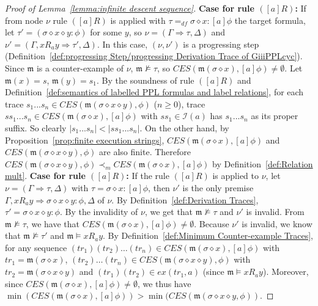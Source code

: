 \documentclass[manuscript,screen]{acmart}
\newcommand{\mcl}[1]{\mathcal{#1}}
\newcommand{\mfr}[1]{\mathfrak{#1}}
\newcommand{\dddef}[0]{=_{df}}
\newcommand{\mult}[0]{\preceq_m}
\newcommand{\pmult}[0]{\prec_m}
\newcommand{\lm}[0]{\mfr{m}}
\newcommand{\EX}[0]{\textit{CES}}
\newcommand{\ex}[0]{\textit{ex}}
\newcommand{\mex}[0]{\textit{mex}}
\newcommand{\cat}[0]{\diamond}
\newcommand{\I}[0]{\mcl{I}}
\begin{document}
\begin{proof}[Proof of Lemma~\ref{lemma:infinite descent sequence}]
\ifx
\textbf{Case for rule $([a]R)$: }
    If from node $\nu$ rule $([a]R)$ is applied with $\tau\dddef \sigma\cat x : [a]\phi$ the target formula, 
    let $\tau' = (\sigma\cat x\cat y : \phi)$ for some $y$, so $\nu=(\Gamma\Rightarrow \tau, \Delta)$ and $\nu' = (\Gamma, xR_a y\Rightarrow \tau', \Delta)$. 
    In this case, $(\nu, \nu')$ is a progressing step (Definition~\ref{def:progressing Step/progressing Derivation Trace of GiiiPPLcyc}). 
    Since $\lm$ is a counter-example of $\nu$, $\lm\not\models \tau$, so $\EX(\lm(\sigma\cat x), [a]\phi)\neq \emptyset$. 
    Let $\lm(x) = s$, $\lm(y) = s_1$. 
    By the soundness of rule $([a]R)$ and Definition~\ref{def:semantics of labelled PPL formulas and label relations}, for each trace $s_1...s_n\in \EX(\lm(\sigma\cat x\cat y), \phi)$ ($n\ge 0$), 
    trace $ss_1...s_n\in \EX(\lm(\sigma\cat x), [a]\phi)$ with $ss_1\in \I(a)$ has $s_1...s_n$ as its proper suffix. 
    So clearly $|s_1...s_n| < |ss_1...s_n|$. 
    On the other hand, by Proposition~\ref{prop:finite execution strings}, %
    $\EX(\lm(\sigma\cat x), [a]\phi)$ and $\EX(\lm(\sigma\cat x\cat y), \phi)$
    are also finite. 
    Therefore $\EX(\lm(\sigma\cat x\cat y), \phi)\pmult \EX(\lm(\sigma\cat x), [a]\phi)$ by Definition~\ref{def:Relation mult}. 
\fi
\textbf{Case for rule $([a]R)$: }
If the rule $([a]R)$ is applied to $\nu$, 
let $\nu = (\Gamma\Rightarrow \tau, \Delta)$ with $\tau = \sigma\cat x : [a]\phi$, 
then $\nu'$ is the only premise $\Gamma, xR_a y\Rightarrow \sigma\cat x\cat y : \phi, \Delta$ of $\nu$. 
By Definition~\ref{def:Derivation Traces},  $\tau' = \sigma\cat x\cat y : \phi$. %
    By the invalidity of $\nu$, we get that $\lm\not\models \tau$ and $\nu'$ is invalid. 
    From $\lm\not\models \tau$, we have that $\EX(\lm(\sigma\cat x), [a]\phi)\neq \emptyset$. 
Because $\nu'$ is invalid, we know that $\lm\not\models \tau'$ and $\lm\models xR_a y$. 
    By Definition~\ref{def:Minimum Counter-example Traces}, 
for any sequence $(tr_1)(tr_2)\ldots(tr_n)\in\EX(\lm(\sigma\cat x), [a]\phi)$ with $tr_1 = \lm(\sigma\cat x)$, $(tr_2)\ldots(tr_n)\in \EX(\lm(\sigma\cat x\cat y), \phi)$ with $tr_2 = \lm(\sigma\cat x\cat y)$ and $(tr_1)(tr_2)\in \ex(tr_1, a)$ (since $\lm\models xR_a y$). 
Moreover, since $\EX(\lm(\sigma\cat x), [a]\phi)\neq \emptyset$, 
    we thus have $\min(\EX(\lm(\sigma\cat x), [a]\phi)) > \min(\EX(\lm(\sigma\cat x\cat y, \phi))$. 


\end{proof}
\end{document}
